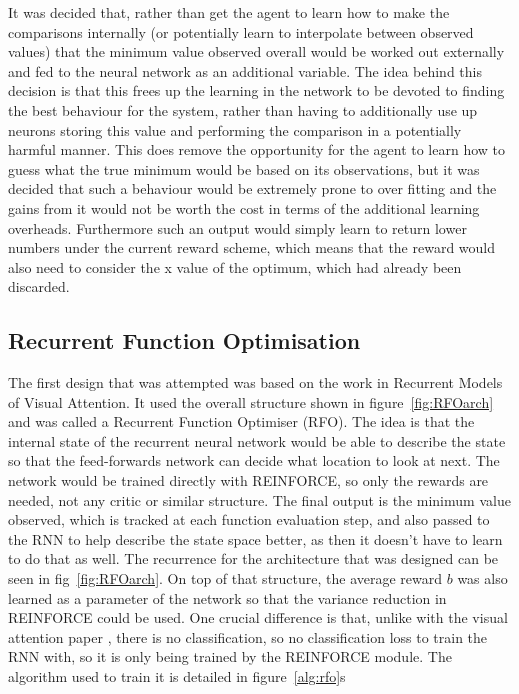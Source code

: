 It was decided that, rather than get the agent to learn how to make the comparisons internally (or potentially learn to interpolate between observed values) that the minimum value observed overall would be worked out externally and fed to the neural network as an additional variable. The idea behind this decision is that this frees up the learning in the network to be devoted to finding the best behaviour for the system, rather than having to additionally use up neurons storing this value and performing the comparison in a potentially harmful manner. This does remove the opportunity for the agent to learn how to guess what the true minimum would be based on its observations, but it was decided that such a behaviour would be extremely prone to over fitting and the gains from it would not be worth the cost in terms of the additional learning overheads. Furthermore such an output would simply learn to return lower numbers under the current reward scheme, which means that the reward would also need to consider the x value of the optimum, which had already been discarded.

\subsection{Recurrent Function Optimisation}
The first design that was attempted was based on the work in Recurrent Models of Visual Attention\cite{RVA}. It used the overall structure shown in figure~\ref{fig:RFOarch} and was called a Recurrent Function Optimiser (RFO). The idea is that the internal state of the recurrent neural network would be able to describe the state so that the feed-forwards network can decide what location to look at next. The network would be trained directly with REINFORCE, so only the rewards are needed, not any critic or similar structure. The final output is the minimum value observed, which is tracked at each function evaluation step, and also passed to the RNN to help describe the state space better, as then it doesn't have to learn to do that as well. The recurrence for the architecture that was designed can be seen in fig~\ref{fig:RFOarch}. On top of that structure, the average reward $b$ was also learned as a parameter of the network so that the variance reduction in REINFORCE could be used. One crucial difference is that, unlike with the visual attention paper \cite{RVA}, there is no classification, so no classification loss to train the RNN with, so it is only being trained by the REINFORCE module. The algorithm used to train it is detailed in figure~\ref{alg:rfo}s

